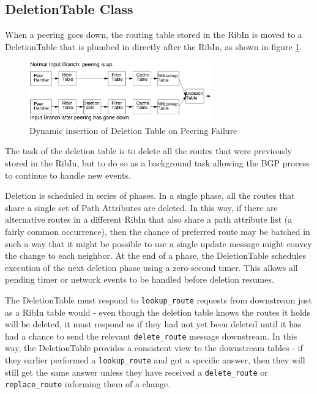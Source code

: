 \documentclass[11pt]{article}
\begin{document}
\subsection{DeletionTable Class}

When a peering goes down, the routing table stored in the RibIn is
moved to a DeletionTable that is plumbed in directly after the RibIn,
as shown in figure \ref{del_table}.
\begin{figure}[htb]
\centerline{\includegraphics[width=0.7\textwidth]{figs/del_table}}
\vspace{.05in}
\caption{\label{del_table}Dynamic insertion of Deletion Table on
Peering Failure}
\end{figure}
The task of the deletion table is to delete all the routes that were
previously stored in the RibIn, but to do so as a background task
allowing the BGP process to continue to handle new events.

Deletion is scheduled in series of phases.  In a single phase, all the
routes that share a single set of Path Attributes are deleted.  In
this way, if there are alternative routes in a different RibIn that
also share a path attribute list (a fairly common occurrence), then the
chance of preferred route may be batched in such a way that it might be
possible to use a single update message might convey the change to
each neighbor.  At the end of a phase, the DeletionTable schedules
execution of the next deletion phase using a zero-second timer.  This
allows all pending timer or network events to be handled before
deletion resumes.

The DeletionTable must respond to {\tt lookup\_route} requests from
downstream just as a RibIn table would - even though the deletion
table knows the routes it holds will be deleted, it must respond as if
they had not yet been deleted until it has had a chance to send the
relevant {\tt delete\_route} message downstream.  In this way, the
DeletionTable provides a consistent view to the downstream tables - if
they earlier performed a {\tt lookup\_route} and got a specific answer,
then they will still get the same answer unless they have received a
{\tt delete\_route} or {\tt replace\_route} informing them of a
change.
\end{document}
